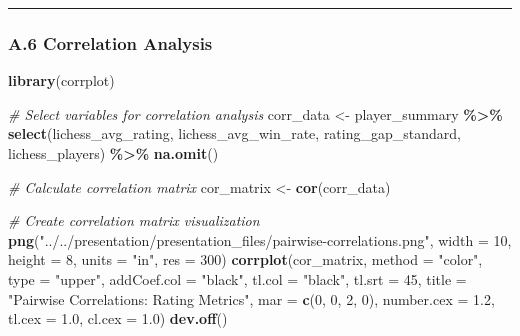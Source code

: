 \documentclass[
]{article}
\newenvironment{Shaded}{\begin{snugshade}}{\end{snugshade}}
\newcommand{\AttributeTok}[1]{\textcolor[rgb]{0.13,0.29,0.53}{#1}}
\newcommand{\CommentTok}[1]{\textcolor[rgb]{0.56,0.35,0.01}{\textit{#1}}}
\newcommand{\DecValTok}[1]{\textcolor[rgb]{0.00,0.00,0.81}{#1}}
\newcommand{\FloatTok}[1]{\textcolor[rgb]{0.00,0.00,0.81}{#1}}
\newcommand{\FunctionTok}[1]{\textcolor[rgb]{0.13,0.29,0.53}{\textbf{#1}}}
\newcommand{\NormalTok}[1]{#1}
\newcommand{\OtherTok}[1]{\textcolor[rgb]{0.56,0.35,0.01}{#1}}
\newcommand{\SpecialCharTok}[1]{\textcolor[rgb]{0.81,0.36,0.00}{\textbf{#1}}}
\newcommand{\StringTok}[1]{\textcolor[rgb]{0.31,0.60,0.02}{#1}}
\begin{document}
\begin{center}\rule{0.5\linewidth}{0.5pt}\end{center}

\subsubsection{A.6 Correlation Analysis}\label{a.6-correlation-analysis}

\begin{Shaded}
\begin{Highlighting}[]
\FunctionTok{library}\NormalTok{(corrplot)}

\CommentTok{\# Select variables for correlation analysis}
\NormalTok{corr\_data }\OtherTok{\textless{}{-}}\NormalTok{ player\_summary }\SpecialCharTok{\%\textgreater{}\%}
  \FunctionTok{select}\NormalTok{(lichess\_avg\_rating, lichess\_avg\_win\_rate, }
\NormalTok{         rating\_gap\_standard, lichess\_players) }\SpecialCharTok{\%\textgreater{}\%}
  \FunctionTok{na.omit}\NormalTok{()}

\CommentTok{\# Calculate correlation matrix}
\NormalTok{cor\_matrix }\OtherTok{\textless{}{-}} \FunctionTok{cor}\NormalTok{(corr\_data)}

\CommentTok{\# Create correlation matrix visualization}
\FunctionTok{png}\NormalTok{(}\StringTok{"../../presentation/presentation\_files/pairwise{-}correlations.png"}\NormalTok{, }
    \AttributeTok{width =} \DecValTok{10}\NormalTok{, }\AttributeTok{height =} \DecValTok{8}\NormalTok{, }\AttributeTok{units =} \StringTok{"in"}\NormalTok{, }\AttributeTok{res =} \DecValTok{300}\NormalTok{)}
\FunctionTok{corrplot}\NormalTok{(cor\_matrix, }
         \AttributeTok{method =} \StringTok{"color"}\NormalTok{,}
         \AttributeTok{type =} \StringTok{"upper"}\NormalTok{,}
         \AttributeTok{addCoef.col =} \StringTok{"black"}\NormalTok{,}
         \AttributeTok{tl.col =} \StringTok{"black"}\NormalTok{,}
         \AttributeTok{tl.srt =} \DecValTok{45}\NormalTok{,}
         \AttributeTok{title =} \StringTok{"Pairwise Correlations: Rating Metrics"}\NormalTok{,}
         \AttributeTok{mar =} \FunctionTok{c}\NormalTok{(}\DecValTok{0}\NormalTok{, }\DecValTok{0}\NormalTok{, }\DecValTok{2}\NormalTok{, }\DecValTok{0}\NormalTok{),}
         \AttributeTok{number.cex =} \FloatTok{1.2}\NormalTok{,}
         \AttributeTok{tl.cex =} \FloatTok{1.0}\NormalTok{,}
         \AttributeTok{cl.cex =} \FloatTok{1.0}\NormalTok{)}
\FunctionTok{dev.off}\NormalTok{()}
\end{Highlighting}
\end{Shaded}
\end{document}

